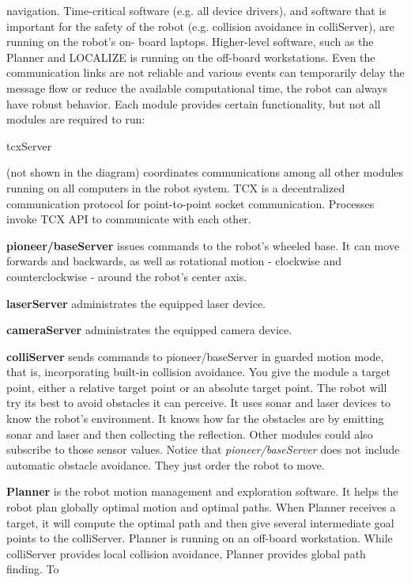 navigation. Time-critical software (e.g. all device drivers), and
software that is important for the safety of the robot (e.g. collision
avoidance in colliServer), are running on the robot's on- board
laptops. Higher-level software, such as the Planner and LOCALIZE is
running on the off-board workstations. Even the communication links
are not reliable and various events can temporarily delay the message
flow or reduce the available computational time, the robot can always
have robust behavior. Each module provides certain functionality, but
not all modules are required to run:\par \begin{itemize}{\bf \item
    tcxServer} (not shown in the diagram) coordinates communications
  among all other modules running on all computers in the robot
  system. TCX is a decentralized communication protocol for
  point-to-point socket communication. Processes invoke TCX API to
  communicate with each other.\item {\bf pioneer/baseServer} issues
  commands to the robot's wheeled base. It can move forwards and
  backwards, as well as rotational motion - clockwise and
  counterclockwise - around the robot's center axis.\item {\bf
    laserServer} administrates the equipped laser device. \item {\bf
    cameraServer }administrates the equipped camera device.\item {\bf
    colliServer} sends commands to pioneer/baseServer in guarded
  motion mode, that is, incorporating built-in collision avoidance.
  You give the module a target point, either a relative target point
  or an absolute target point. The robot will try its best to avoid
  obstacles it can perceive. It uses sonar and laser devices to know
  the robot's environment. It knows how far the obstacles are by
  emitting sonar and laser and then collecting the reflection. Other
  modules could also subscribe to those sensor values. Notice that
  {\it pioneer/baseServer} does not include automatic obstacle
  avoidance. They just order the robot to move.\item {\bf Planner} is
  the robot motion management and exploration software. It helps the
  robot plan globally optimal motion and optimal paths. When Planner
  receives a target, it will compute the optimal path and then give
  several intermediate goal points to the colliServer. Planner is
  running on an off-board workstation. While colliServer provides
  local collision avoidance, Planner provides global path finding. To

\end{itemize}
